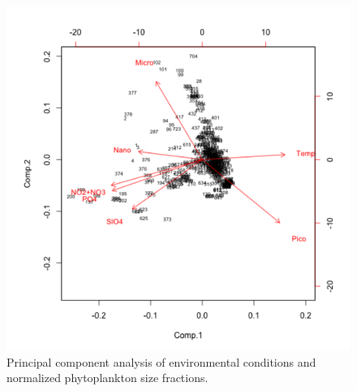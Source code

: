 \begin{figure}
\centering
\includegraphics[trim = 0mm 0mm 0mm 0mm, clip, width=0.9\linewidth]{./Chp2-Pre/amt_PrinComp.png}
\caption[Scheme]{\small {Principal component analysis of environmental conditions and normalized phytoplankton size fractions.}}
\label{PrinComp}
\end{figure}

